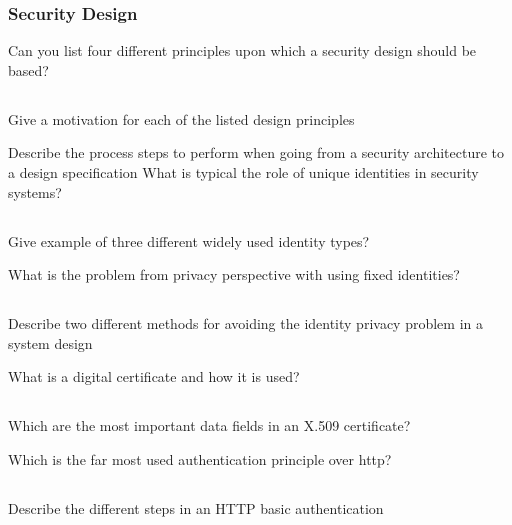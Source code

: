 \section{Security Design}\label{sec:Security_Design}
\begin{questions}
\question{} Can you list four different principles upon which a security design should be based?
  \begin{parts}
  \part{} Give a motivation for each of the listed design principles
  \end{parts}

\question{} Describe the process steps to perform when going from a security architecture to a design specification
\question{} What is typical the role of unique identities in security systems?
  \begin{parts}
  \part{} Give example of three different widely used identity types?
  \end{parts}

\question{} What is the problem from privacy perspective with using fixed identities?
  \begin{parts}
  \part{} Describe two different methods for avoiding the identity privacy problem in a system design
  \end{parts}

\question{} What is a digital certificate and how it is used?
  \begin{parts}
  \part{} Which are the most important data fields in an X.509 certificate?
  \end{parts}

\question{} Which is the far most used authentication principle over http?
  \begin{parts}
  \part{} Describe the different steps in an HTTP basic authentication

\end{parts}
\end{questions}
